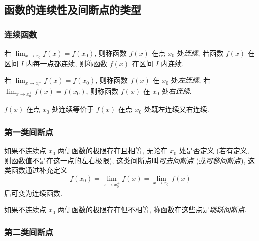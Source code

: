 \subsection{函数的连续性及间断点的类型}

\subsubsection{连续函数}

\begin{definition}[函数连续]
    若 $\displaystyle\lim_{x\to x_0}f(x)=f(x_0)$, 则称函数 $f(x)$ 在点 $x_0$ 处\textit{连续}, 若函数 $f(x)$ 在区间 $ I $ 内每一点都连续, 则称函数 $f(x)$ 在区间 $I$ 内连续.
\end{definition}

\begin{definition}[单侧连续]
    若 $\displaystyle\lim_{x\to x_0^-}f(x)=f(x_0)$, 则称函数 $f(x)$ 在 $x_0$ 处\textit{左连续}; 若 $\displaystyle\lim_{x\to x_0^+}f(x)=f(x_0)$, 则称函数 $f(x)$ 在 $x_0$ 处\textit{右连续}.
    \label{unilateral continuous}
\end{definition}

\begin{theorem}[函数连续的充要条件]
    $f(x)$ 在点 $x_0$ 处连续等价于 $f(x)$  在点 $x_0$ 处既左连续又右连续.
\end{theorem}

\subsubsection{第一类间断点}

\begin{definition}[可去间断点]
    如果不连续点 $ x_{0} $ 两侧函数的极限存在且相等, 无论在 $ x_{0} $ 处是否定义
    (若有定义, 则函数值不是在这一点的左右极限), 
    这类间断点叫\textit{可去间断点} (或\textit{可移间断点}), 这类函数通过补充定义
    $$f\left(x_{0}\right)=\lim _{x \rightarrow x_{0}^{+}} f(x)=\lim _{x \rightarrow x_{0}^{-}} f(x)$$
    后可变为连续函数.
\end{definition}

\begin{definition}[跳跃间断点]
    如果不连续点 $x_{0}$ 两侧函数的极限存在但不相等, 称函数在这些点是\textit{跳跃间断点}.
\end{definition}

\subsubsection{第二类间断点}

